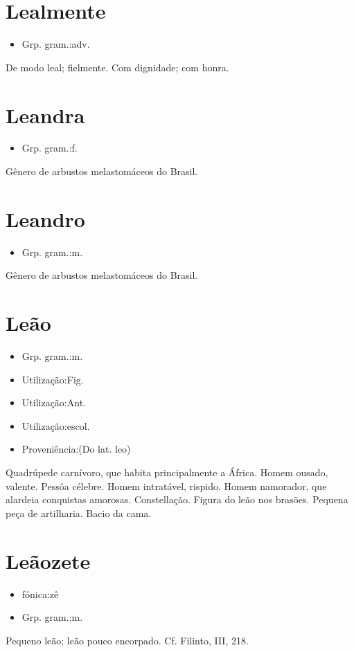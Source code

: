 \section{Lealmente}
\begin{itemize}
\item {Grp. gram.:adv.}
\end{itemize}
De modo leal; fielmente.
Com dignidade; com honra.
\section{Leandra}
\begin{itemize}
\item {Grp. gram.:f.}
\end{itemize}
Gênero de arbustos melastomáceos do Brasil.
\section{Leandro}
\begin{itemize}
\item {Grp. gram.:m.}
\end{itemize}
Gênero de arbustos melastomáceos do Brasil.
\section{Leão}
\begin{itemize}
\item {Grp. gram.:m.}
\end{itemize}
\begin{itemize}
\item {Utilização:Fig.}
\end{itemize}
\begin{itemize}
\item {Utilização:Ant.}
\end{itemize}
\begin{itemize}
\item {Utilização:escol.}
\end{itemize}
\begin{itemize}
\item {Proveniência:(Do lat. \textunderscore leo\textunderscore )}
\end{itemize}
Quadrúpede carnívoro, que habita principalmente a África.
Homem ousado, valente.
Pessôa célebre.
Homem intratável, rispido.
Homem namorador, que alardeia conquistas amorosas.
Constellação.
Figura do leão nos brasões.
Pequena peça de artilharia.
Bacio da cama.
\section{Leãozete}
\begin{itemize}
\item {fónica:zê}
\end{itemize}
\begin{itemize}
\item {Grp. gram.:m.}
\end{itemize}
Pequeno leão; leão pouco encorpado. Cf. Filinto, III, 218.
